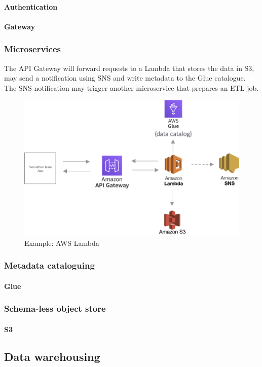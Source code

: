 \documentclass[10pt]{article}
\begin{document}
\paragraph{Authentication}
\paragraph{Gateway}

\subsubsection{Microservices}
The API Gateway will forward requests to a Lambda that stores the data in S3, may send a notification using SNS and write metadata to the Glue catalogue. The SNS notification may trigger another microservice that prepares an ETL job.
\begin{figure}[h!]
	\centering
	\includegraphics[width=0.8\linewidth]{images/Lambda.png}
	\caption*{Example: AWS Lambda}	
\end{figure}

\subsubsection{Metadata cataloguing}
\paragraph{Glue}
\subsubsection{Schema-less object store}
\paragraph{S3}

\subsection{Data warehousing}
\end{document}
